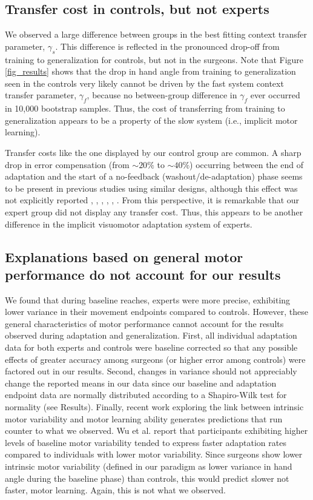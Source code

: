 \documentclass[jou, 11pt, longtable, floatsintext, notab]{apa6}
\begin{document}
\subsection{Transfer cost in controls, but not experts}
We observed a large difference between groups in the best
fitting context transfer parameter, $\gamma_s$. This
difference is reflected in the pronounced drop-off from
training to generalization for controls, but not in the
surgeons. Note that Figure \ref{fig_results} shows that the
drop in hand angle from training to generalization seen in
the controls very likely cannot be driven by the fast system
context transfer parameter, $\gamma_f$, because no
between-group difference in $\gamma_f$ ever occurred in 10,000
bootstrap samples. Thus, the cost of transferring from
training to generalization appears to be a property of the
slow system (i.e., implicit motor learning).

Transfer costs like the one displayed by our control group
are common. A sharp drop in error compensation (from $\sim20\%$ to
$\sim40\%$)  occurring between the
end of adaptation and the start of a no-feedback
(washout/de-adaptation) phase seems to be present in previous studies using similar designs, although this effect was not explicitly reported
\cite{sternad_motor_2009},
\cite{mazzoni_implicit_2006},
\cite{sadnicka_normal_2014}, \cite{haar_dissociating_2015},
\cite{jalali_neural_2018},
\cite{nakagawa-silva_framework_2018}. From this
perspective, it is remarkable that our expert group did not
display any transfer cost. Thus, this appears to be another
difference in the implicit visuomotor adaptation system of
experts.

\subsection{Explanations based on general motor performance do not account for our results}
We found that during baseline reaches, experts were more
precise, exhibiting lower variance in their movement
endpoints compared to controls. However, these general
characteristics of motor performance cannot account for the
results observed during adaptation and generalization.
First, all individual adaptation data for both experts and
controls were baseline corrected so that any possible
effects of greater accuracy among surgeons (or higher error
among controls) were factored out in our results. Second,
changes in variance should not appreciably change the
reported means in our data since our baseline and adaptation
endpoint data are normally distributed according to a
Shapiro-Wilk test for normality (see Results). Finally,
recent work exploring the link between intrinsic motor
variability and motor learning ability
\cite{anguera_failure_2011} generates predictions that run
counter to what we observed. Wu et al.
\cite{wu_temporal_2014} report that participants exhibiting
higher levels of baseline motor variability tended to
express faster adaptation rates compared to individuals with
lower motor variability. Since surgeons show lower intrinsic
motor variability (defined in our paradigm as lower variance
in hand angle during the baseline phase) than controls, this
would predict slower not faster, motor learning. Again, this
is not what we observed.
\end{document}
